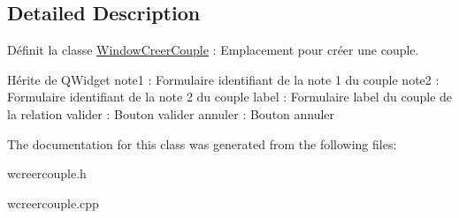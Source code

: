 \subsection{Detailed Description}
Définit la classe \hyperlink{class_window_creer_couple}{Window\+Creer\+Couple} \+: Emplacement pour créer une couple. 

Hérite de Q\+Widget note1 \+: Formulaire identifiant de la note 1 du couple note2 \+: Formulaire identifiant de la note 2 du couple label \+: Formulaire label du couple de la relation valider \+: Bouton valider annuler \+: Bouton annuler 

The documentation for this class was generated from the following files\+:\begin{DoxyCompactItemize}
\item 
wcreercouple.\+h\item 
wcreercouple.\+cpp\end{DoxyCompactItemize}
